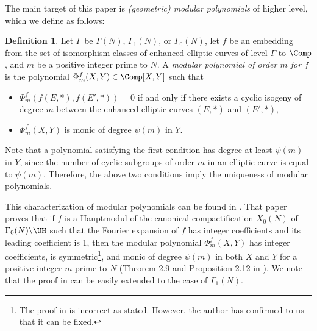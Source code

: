 \documentclass{amsart}
\theoremstyle{definition}
\newtheorem{definition}[theorem]{Definition}
\theoremstyle{remark}
\numberwithin{equation}{section}
\begin{document}
The main target of this paper is \emph{(geometric) modular polynomials} of higher level,
which we define as follows:
\begin{definition}\label{def:modular_polynomial_higher_level}
    Let $\Gamma$ be $\Gamma(N)$, $\Gamma_1(N)$, or $\Gamma_0(N)$,
    let $f$ be an embedding from the set of isomorphism classes of
    enhanced elliptic curves of level $\Gamma$ to $\Comp$,
    and $m$ be a positive integer prime to $N$.
    A \emph{modular polynomial of order $m$ for $f$}
    is the polynomial $\Phi_m^f(X, Y) \in \Comp[X, Y]$
    such that
    \begin{itemize}
        \item $\Phi_m^f(f(E, \ast), f(E', \ast)) = 0$
            if and only if there exists a cyclic isogeny of degree $m$
            between the enhanced elliptic curves $(E, \ast)$ and $(E', \ast)$,
        \item $\Phi_m^f(X, Y)$ is monic of degree $\psi(m)$ in $Y$.
    \end{itemize}
\end{definition}
Note that a polynomial satisfying the first condition has degree at least $\psi(m)$ in $Y$,
since the number of cyclic subgroups of order $m$ in an elliptic curve is equal to $\psi(m)$.
Therefore, the above two conditions imply the uniqueness of modular polynomials.

This characterization of modular polynomials can be found in \cite{Murakami2020}.
That paper proves that 
if $f$ is a Hauptmodul of the canonical compactification $X_0(N)$ of $\Gamma_0(N)\backslash \UH$
such that the Fourier expansion of $f$ has integer coefficients
and its leading coefficient is 1,
then the modular polynomial $\Phi_m^f(X, Y)$ has integer coefficients,
is symmetric\footnote{
    The proof in \cite[Proposition 2.12]{Murakami2020} is incorrect as stated.
    However, the author has confirmed to us that it can be fixed.
}, and monic of degree $\psi(m)$ in both $X$ and $Y$
for a positive integer $m$ prime to $N$
(Theorem 2.9 and Proposition 2.12 in \cite{Murakami2020}).
We note that the proof in \cite{Murakami2020} can be easily extended to the case of $\Gamma_1(N)$.
\end{document}
